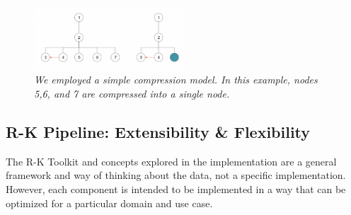 \begin{figure}
	\centering
        \includegraphics[width=0.5\textwidth]{images/compression_example2.png}
	\caption{\textit{We employed a simple compression model. In this example, nodes 5,6, and 7 are compressed into a single node.}}
	\label{fig:compression_example}
\end{figure}


\subsection{R-K Pipeline: Extensibility \& Flexibility}

The R-K Toolkit and concepts explored in the implementation are a general framework and way of thinking about the data, not a specific implementation. However, each component is intended to be implemented in a way that can be optimized for a particular domain and use case.
